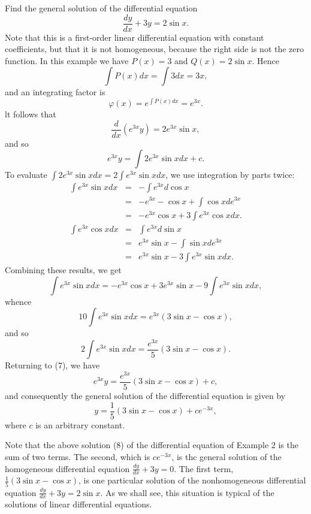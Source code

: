 \begin{example} Find the general solution of the differential equation 
$$
\frac{dy}{dx} + 3y = 2 \sin x.
$$
Note that this is a first-order linear differential equation with constant coefficients, but that it is not homogeneous, because the right side is not the zero function. In this example we have $P(x) = 3$ and $Q(x) = 2 \sin x$. Hence
$$
\int P(x)dx = \int 3 dx = 3x ,
$$ 
and an integrating factor is
$$
\varphi(x) =  e^{\int P(x)dx} = e^{3x} . 
$$
lt follows that
$$
\frac{d}{dx} (e^{3x} y) = 2e^{3x} \sin x,
$$
and so 
\begin{equation}
e^{3x} y = \int 2e^{3x} \sin x dx + c.  
\label{eq11.2.7}
\end{equation}
To evaluate $\int 2e^{3x} \sin xdx = 2\int e^{3x} \sin x dx$, we use integration by parts twice:
\begin{eqnarray*}
\int e^{3x} \sin x dx &=& - \int e^{3x} d \cos x \\
&=& -e^{3x} - \cos x + \int \cos x de^{3x} \\
&=& -e^{3x} \cos x + 3 \int e^{3x} \cos x dx. \\
\int e^{3x} \cos x dx &=& \int e^{3x} d \sin x \\
&=& e^{3x} \sin x - \int \sin x de^{3x}\\
&=& e^{3x} \sin x - 3\int e^{3x} \sin x dx.
\end{eqnarray*}
Combining these results, we get
$$
\int e^{3x} \sin x dx = - e^{3x} \cos x  + 3e^{3x} \sin x - 9 \int e^{3x} \sin x dx,
$$
whence
$$
10 \int e^{3x} \sin x dx = e^{3x}(3 \sin x - \cos x),
$$
and so
$$
2\int e^{3x} \sin x dx = \frac{e^{3x}}{5} (3 \sin x - \cos x).
$$
Returning to (7), we have
$$
e^{3x}y = \frac{e^{3x}}{5} (3 \sin x - \cos x) + c,
$$
and consequently the general solution of the differential equation is given by 
\begin{equation}
y = \frac{1}{5} (3 \sin x - \cos x) + ce^{-3x}  ,  
\label{eq11.2.8}
\end{equation}
where $c$ is an arbitrary constant.
\end{example}

Note that the above solution (8) of the differential equation of Example 2 is the sum of two terms. The second, which is $ce^{-3x}$, is thc general solution
of the homogeneous differential equation $\frac{dy}{dx} + 3y = 0$. The first term, $\frac{1}{5}(3 \sin x - \cos x)$, is one particular solution of the nonhomogeneous differential equation $\frac{dy}{dx} + 3y = 2 \sin x$. As we shall see, this situation is typical of the solutions of linear differential equations.

